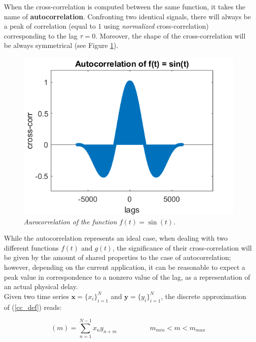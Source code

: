 \documentclass[12pt, a4paper]{report}
\begin{document}
When the cross-correlation is computed between the same function, it takes the name of \textbf{autocorrelation}. Confronting two identical signals, there will always be a peak of correlation (equal to $1$ using \textit{normalized} cross-correlation) corresponding to the lag $\tau = 0$. Moreover, the shape of the cross-correlation will be always symmetrical (see Figure \ref{autocorr}).

\begin{figure}[H]
	\begin{center}
		\includegraphics[scale=.75]{autocorr.png} 
	\end{center} 
	\caption{\textit{Aurocorrelation of the function $ f(t) = \sin(t) $.}} \label{autocorr}
	
\end{figure}


While the autocorrelation represents an ideal case, when dealing with two different functions $f(t)$ and $g(t)$, the significance of their cross-correlation will be given by the amount of shared properties to the case of autocorrelation; however, depending on the current application, it can be reasonable to expect a peak value in correspondence to a nonzero value of the lag, as a representation of an actual physical delay.
\\

Given two time series $ \textbf{x} = \{x_i\}_{i=1}^N$ and  $\textbf{y} = \{y_i\}_{i=1}^N$, the discrete approximation of (\ref{cc_def}) reads:


\begin{equation}
	[\textbf{x} \star \textbf{y}] (m) =  \sum_{n=1}^{N-1} x_n y_{n+m} \hspace{2cm} m_{min} < m < m_{max}
\end{equation}  
\end{document}
